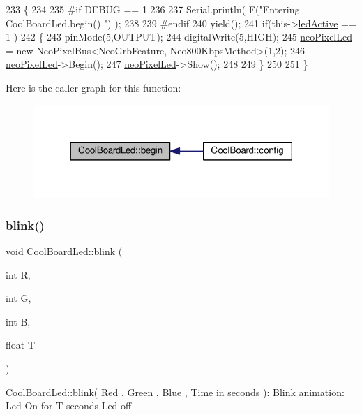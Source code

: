 \begin{DoxyCode}
233 \{
234 
235 \textcolor{preprocessor}{#if DEBUG == 1}
236 
237     Serial.println( F(\textcolor{stringliteral}{"Entering CoolBoardLed.begin() "}) );
238 
239 \textcolor{preprocessor}{#endif}
240     yield();
241     \textcolor{keywordflow}{if}(this->\hyperlink{classCoolBoardLed_a5f17c135516fcf4b44ea8a096ba0177a}{ledActive} == 1 )
242     \{
243         pinMode(5,OUTPUT);
244         digitalWrite(5,HIGH);
245         \hyperlink{classCoolBoardLed_ac2c13fa462a010cd9242bf297c013923}{neoPixelLed} = \textcolor{keyword}{new} NeoPixelBus<NeoGrbFeature, Neo800KbpsMethod>(1,2); 
246         \hyperlink{classCoolBoardLed_ac2c13fa462a010cd9242bf297c013923}{neoPixelLed}->Begin();
247         \hyperlink{classCoolBoardLed_ac2c13fa462a010cd9242bf297c013923}{neoPixelLed}->Show();
248 
249     \}
250 
251 \} 
\end{DoxyCode}
Here is the caller graph for this function\+:
\nopagebreak
\begin{figure}[H]
\begin{center}
\leavevmode
\includegraphics[width=318pt]{classCoolBoardLed_ae3cbde8affcc6f011cbd698c8ef911f6_icgraph}
\end{center}
\end{figure}
\mbox{\label{classCoolBoardLed_a96e1ea13003eee34c9dbcef340404426}} 
\subsubsection{\texorpdfstring{blink()}{blink()}}
{\footnotesize\ttfamily void Cool\+Board\+Led\+::blink (\begin{DoxyParamCaption}\item[{int}]{R,  }\item[{int}]{G,  }\item[{int}]{B,  }\item[{float}]{T }\end{DoxyParamCaption})}

Cool\+Board\+Led\+::blink( Red , Green , Blue , Time in seconds )\+: Blink animation\+: Led On for T seconds Led off 

